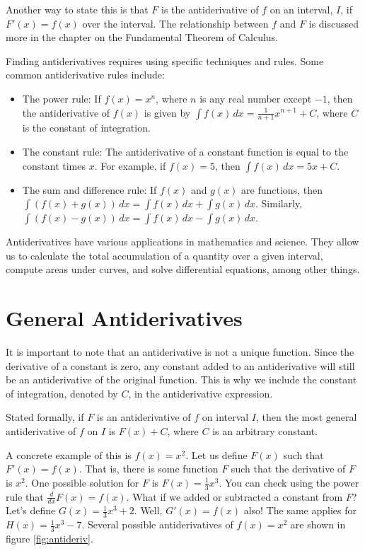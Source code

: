 Another way to state this is that $F$ is the antiderivative of $f$ on 
an interval, $I$, if $F'(x) = f(x)$ over the interval. The 
relationship between $f$ and $F$ is discussed more in the chapter on 
the Fundamental Theorem of Calculus. 

Finding antiderivatives requires using specific techniques and
rules. Some common antiderivative rules include:

\begin{itemize}
\item The power rule: If $f(x) = x^n$, where $n$ is any real number
  except $-1$, then the antiderivative of $f(x)$ is given by $\int
  f(x)\,dx = \frac{1}{n+1}x^{n+1} + C$, where $C$ is the constant of
  integration.

\item The constant rule: The antiderivative of a constant function is
  equal to the constant times $x$. For example, if $f(x) = 5$, then
  $\int f(x)\, dx = 5x + C$.

\item The sum and difference rule: If $f(x)$ and $g(x)$ are functions,
  then $\int (f(x) + g(x)) \, dx = \int f(x) \, dx + \int g(x) \,
  dx$. Similarly, $\int (f(x) - g(x))\,dx = \int f(x) \, dx - \int
  g(x) \, dx$.
\end{itemize}

Antiderivatives have various applications in mathematics and
science. They allow us to calculate the total accumulation of a
quantity over a given interval, compute areas under curves, and solve
differential equations, among other things.

\section{General Antiderivatives}

It is important to note that an antiderivative is not a unique
function. Since the derivative of a constant is zero, any constant
added to an antiderivative will still be an antiderivative of the
original function. This is why we include the constant of integration,
denoted by $C$, in the antiderivative expression.

Stated formally, if $F$ is an antiderivative of $f$ on interval $I$, 
then the most general antiderivative of $f$ on $I$ is $F(x) + C$, 
where $C$ is an arbitrary constant. 


A concrete example of this is $f(x) = x^2$. Let us define $F(x)$ such 
that $F'(x) = f(x)$. That is, there is some function $F$ such that the 
derivative of $F$ is $x^2$. One possible solution for $F$ is $F(x) = 
\frac{1}{3} x^3$. You can check using the power rule that $\frac{d}{dx} 
F(x) = f(x)$. What if we added or subtracted a constant from $F$? Let's 
define $G(x) = \frac{1}{3} x^3 + 2$. Well, $G'(x) = f(x)$ also! 
The same applies for $H(x) = \frac{1}{3} x^3 - 7$. Several possible antiderivatives 
of $f(x) = x^2$ are shown in figure \ref{fig:antideriv}. 

